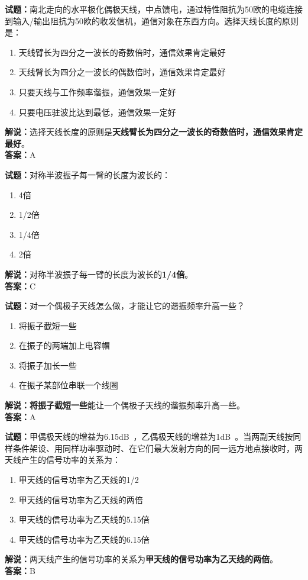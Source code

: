 \documentclass{ctexbook}
\begin{document}

\bigskip


\noindent\textbf{试题：}南北走向的水平极化偶极天线，中点馈电，通过特性阻抗为50欧的电缆连接到输入/输出阻抗为50欧的收发信机，通信对象在东西方向。选择天线长度的原则是：
\begin{enumerate}[leftmargin=3em]
\item 天线臂长为四分之一波长的奇数倍时，通信效果肯定最好
\item 天线臂长为四分之一波长的偶数倍时，通信效果肯定最好
\item 只要天线与工作频率谐振，通信效果一定好
\item 只要电压驻波比达到最低，通信效果一定好
\end{enumerate}
\noindent\textbf{解说：}选择天线长度的原则是\textbf{天线臂长为四分之一波长的奇数倍时，通信效果肯定最好}。\\\noindent\textbf{答案：}A



\bigskip


\noindent\textbf{试题：}对称半波振子每一臂的长度为波长的：
\begin{enumerate}[leftmargin=3em]
\item 4倍
\item 1/2倍
\item 1/4倍
\item 2倍
\end{enumerate}
\noindent\textbf{解说：}对称半波振子每一臂的长度为波长的\textbf{1/4倍}。\\\noindent\textbf{答案：}C

\bigskip


\noindent\textbf{试题：}对一个偶极子天线怎么做，才能让它的谐振频率升高一些？
\begin{enumerate}[leftmargin=3em]
\item 将振子截短一些
\item 在振子的两端加上电容帽
\item 将振子加长一些
\item 在振子某部位串联一个线圈
\end{enumerate}
\noindent\textbf{解说：}\textbf{将振子截短一些}能让一个偶极子天线的谐振频率升高一些。\\\noindent\textbf{答案：}A



\bigskip


\noindent\textbf{试题：}甲偶极天线的增益为6.15\unit[qualifier-mode=combine]{\deci\bel{}}，乙偶极天线的增益为1\unit[qualifier-mode=combine]{\deci\bel{}}。当两副天线按同样条件架设、用同样功率驱动时、在它们最大发射方向的同一远方地点接收时，两天线产生的信号功率的关系为：
\begin{enumerate}[leftmargin=3em]
\item 甲天线的信号功率为乙天线的1/2
\item 甲天线的信号功率为乙天线的两倍
\item 甲天线的信号功率为乙天线的5.15倍
\item 甲天线的信号功率为乙天线的6.15倍
\end{enumerate}
\noindent\textbf{解说：}两天线产生的信号功率的关系为\textbf{甲天线的信号功率为乙天线的两倍}。\\\noindent\textbf{答案：}B
\end{document}
